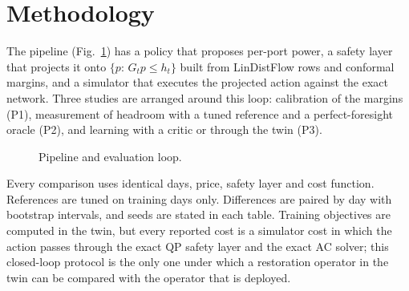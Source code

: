 \documentclass[11pt]{article}
\begin{document}
\section{Methodology}\label{sec:method}
The pipeline (Fig.~\ref{fig:pipeline}) has a policy that proposes per-port power, a safety layer that projects it onto $\{p:\,G_tp\le h_t\}$ built from LinDistFlow rows and conformal margins, and a simulator that executes the projected action against the exact network. Three studies are arranged around this loop: calibration of the margins (P1), measurement of headroom with a tuned reference and a perfect-foresight oracle (P2), and learning with a critic or through the twin (P3).
\begin{figure}[h]\centering
{}
\caption{Pipeline and evaluation loop.}\label{fig:pipeline}\end{figure}
Every comparison uses identical days, price, safety layer and cost function. References are tuned on training days only. Differences are paired by day with bootstrap intervals, and seeds are stated in each table. Training objectives are computed in the twin, but every reported cost is a simulator cost in which the action passes through the exact QP safety layer and the exact AC solver; this closed-loop protocol is the only one under which a restoration operator in the twin can be compared with the operator that is deployed.
\end{document}

